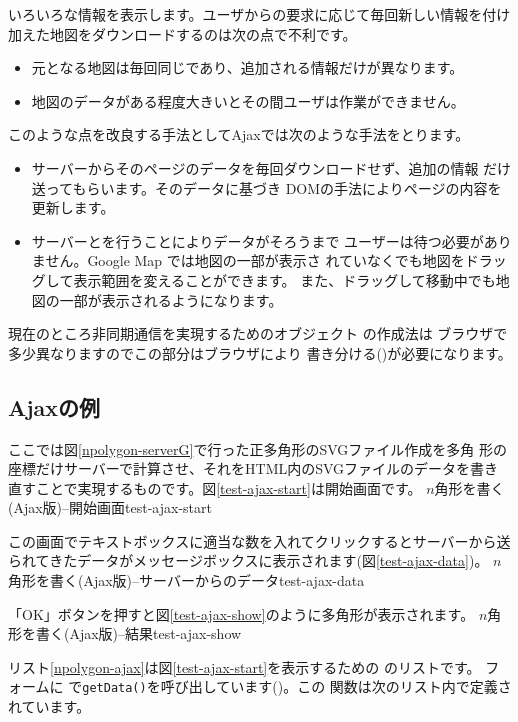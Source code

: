 いろいろな情報を表示します。ユーザからの要求に応じて毎回新しい情報を付け
加えた地図をダウンロードするのは次の点で不利です。
\begin{itemize}
 \item 元となる地図は毎回同じであり、追加される情報だけが異なります。
 \item 地図のデータがある程度大きいとその間ユーザは作業ができません。
\end{itemize}
このような点を改良する手法としてAjaxでは次のような手法をとります。
\begin{itemize}
 \item サーバーからそのページのデータを毎回ダウンロードせず、追加の情報
       だけ送ってもらいます。そのデータに基づき
       DOMの手法によりページの内容を更新します。
 \item サーバーとを行うことによりデータがそろうまで
       ユーザーは待つ必要がありません。Google Map では地図の一部が表示さ
       れていなくでも地図をドラッグして表示範囲を変えることができます。
       また、ドラッグして移動中でも地図の一部が表示されるようになります。
\end{itemize}
現在のところ非同期通信を実現するためのオブジェクト
の作成法は
ブラウザで多少異なりますのでこの部分はブラウザにより
書き分ける()が必要になります。

\subsection{Ajaxの例}\label{AjaxEx}
ここでは図\ref{npolygon-serverG}で行った正多角形のSVGファイル作成を多角
形の座標だけサーバーで計算させ、それをHTML内のSVGファイルのデータを書き
直すことで実現するものです。図\ref{test-ajax-start}は開始画面です。
{$n$角形を書く(Ajax版)--開始画面}{test-ajax-start}

この画面でテキストボックスに適当な数を入れてクリックするとサーバーから送
られてきたデータがメッセージボックスに表示されます(図\ref{test-ajax-data})。
{$n$角形を書く(Ajax版)--サーバーからのデータ}{test-ajax-data}


「OK」ボタンを押すと図\ref{test-ajax-show}のように多角形が表示されます。
{$n$角形を書く(Ajax版)--結果}{test-ajax-show}
%
\newpage

リスト\ref{npolygon-ajax}は図\ref{test-ajax-start}を表示するための\HTML
のリストです。
フォームに
       で\texttt{getData()}を呼び出しています()。この
       関数は次のリスト内で定義されています。

